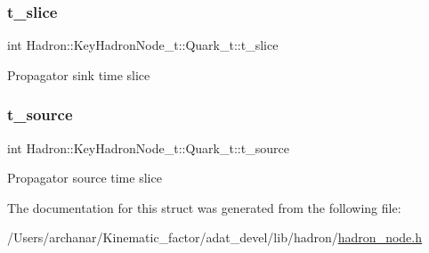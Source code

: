 \subsubsection{\texorpdfstring{t\_slice}{t\_slice}}
{\footnotesize\ttfamily int Hadron\+::\+Key\+Hadron\+Node\+\_\+t\+::\+Quark\+\_\+t\+::t\+\_\+slice}

Propagator sink time slice \mbox{\label{structHadron_1_1KeyHadronNode__t_1_1Quark__t_af7bcd4ab54e441cfbc6dbf2ba43f3fa6}} 
\subsubsection{\texorpdfstring{t\_source}{t\_source}}
{\footnotesize\ttfamily int Hadron\+::\+Key\+Hadron\+Node\+\_\+t\+::\+Quark\+\_\+t\+::t\+\_\+source}

Propagator source time slice 

The documentation for this struct was generated from the following file\+:\begin{DoxyCompactItemize}
\item 
/\+Users/archanar/\+Kinematic\+\_\+factor/adat\+\_\+devel/lib/hadron/\mbox{\hyperlink{lib_2hadron_2hadron__node_8h}{hadron\+\_\+node.\+h}}\end{DoxyCompactItemize}
